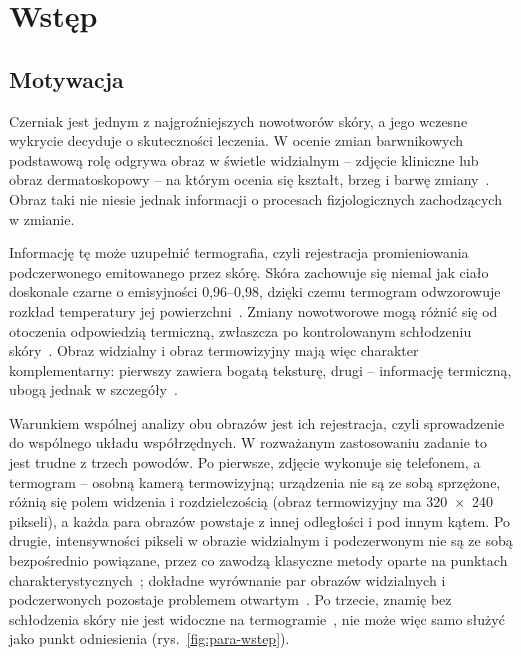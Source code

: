 
\chapter{Wstęp}
\label{chap:wstep}

\section{Motywacja}
\label{sec:motywacja}

Czerniak jest jednym z najgroźniejszych nowotworów skóry, a jego wczesne wykrycie decyduje o skuteczności leczenia. W ocenie zmian barwnikowych podstawową rolę odgrywa obraz w świetle widzialnym -- zdjęcie kliniczne lub obraz dermatoskopowy -- na którym ocenia się kształt, brzeg i barwę zmiany~\cite{dermoscopy}. Obraz taki nie niesie jednak informacji o procesach fizjologicznych zachodzących w zmianie.

Informację tę może uzupełnić termografia, czyli rejestracja promieniowania podczerwonego emitowanego przez skórę. Skóra zachowuje się niemal jak ciało doskonale czarne o emisyjności 0,96--0,98, dzięki czemu termogram odwzorowuje rozkład temperatury jej powierzchni~\cite{infared-thermal-imaging}. Zmiany nowotworowe mogą różnić się od otoczenia odpowiedzią termiczną, zwłaszcza po kontrolowanym schłodzeniu skóry~\cite{visualization-detection-cancer,magalhaes2019}. Obraz widzialny i obraz termowizyjny mają więc charakter komplementarny: pierwszy zawiera bogatą teksturę, drugi -- informację termiczną, ubogą jednak w szczegóły~\cite{deep-learning}.

Warunkiem wspólnej analizy obu obrazów jest ich rejestracja, czyli sprowadzenie do wspólnego układu współrzędnych. W rozważanym zastosowaniu zadanie to jest trudne z trzech powodów. Po pierwsze, zdjęcie wykonuje się telefonem, a termogram -- osobną kamerą termowizyjną; urządzenia nie są ze sobą sprzężone, różnią się polem widzenia i rozdzielczością (obraz termowizyjny ma 320~$\times$~240 pikseli), a każda para obrazów powstaje z innej odległości i pod innym kątem. Po drugie, intensywności pikseli w obrazie widzialnym i podczerwonym nie są ze sobą bezpośrednio powiązane, przez co zawodzą klasyczne metody oparte na punktach charakterystycznych~\cite{visible-and-infared}; dokładne wyrównanie par obrazów widzialnych i podczerwonych pozostaje problemem otwartym~\cite{deep-learning}. Po trzecie, znamię bez schłodzenia skóry nie jest widoczne na termogramie~\cite{visualization-detection-cancer}, nie może więc samo służyć jako punkt odniesienia (rys.~\ref{fig:para-wstep}).

